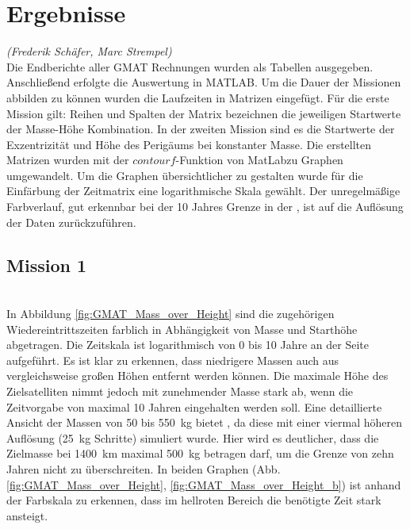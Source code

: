 




\section{Ergebnisse}
\hfill\emph{(Frederik Schäfer, Marc Strempel)}\\
Die Endberichte aller GMAT Rechnungen wurden als Tabellen ausgegeben.  Anschließend erfolgte die Auswertung in MATLAB\textregistered.
Um die Dauer der Missionen abbilden zu können wurden die Laufzeiten in Matrizen eingefügt. 
Für die erste Mission gilt: Reihen und Spalten der Matrix bezeichnen die jeweiligen Startwerte der Masse-Höhe Kombination. In der zweiten Mission sind es die Startwerte der Exzentrizität und Höhe des Perigäums bei konstanter Masse.
Die erstellten Matrizen wurden mit der $contourf$-Funktion von MatLab\textregistered \space zu Graphen umgewandelt. Um die Graphen übersichtlicher zu gestalten wurde für die Einfärbung der Zeitmatrix eine logarithmische Skala gewählt. Der unregelmäßige Farbverlauf, gut erkennbar bei der \num{10} Jahres Grenze in der , ist auf die Auflösung der Daten zurückzuführen.\\

\subsection{Mission 1}\\
In Abbildung \ref{fig:GMAT_Mass_over_Height} sind die zugehörigen Wiedereintrittszeiten farblich in Abhängigkeit von Masse und Starthöhe abgetragen. Die Zeitskala ist logarithmisch von \num{0} bis \num{10} Jahre an der Seite aufgeführt.  
Es ist klar zu erkennen, dass niedrigere Massen auch aus vergleichsweise großen Höhen entfernt werden können. Die maximale Höhe des Zielsatelliten nimmt jedoch mit zunehmender Masse stark ab, wenn die Zeitvorgabe von maximal \num{10} Jahren eingehalten werden soll.
Eine detaillierte Ansicht der Massen von \num{50} bis \SI{550}{\kilogram} bietet , da diese mit einer viermal höheren Auflösung (\SI{25}{\kilogram} Schritte) simuliert wurde. Hier wird es deutlicher, dass die Zielmasse bei \SI{1400}{\kilo\metre} maximal \SI{500}{\kilogram} betragen darf, um die Grenze von zehn Jahren nicht zu überschreiten.
In beiden Graphen (Abb. \ref{fig:GMAT_Mass_over_Height}, \ref{fig:GMAT_Mass_over_Height_b}) ist anhand der Farbskala zu erkennen, dass im hellroten Bereich die benötigte Zeit stark ansteigt. 

